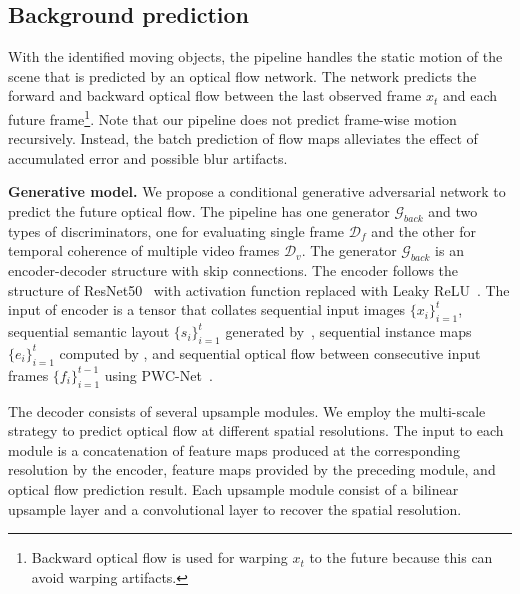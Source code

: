 \documentclass[10pt,twocolumn,letterpaper]{article}
\begin{document}
\subsection{Background prediction}
With the identified moving objects, the pipeline handles the static motion of the scene that is predicted by an optical flow network. The network predicts the forward and backward optical flow between the last observed frame $x_{t}$ and each future frame\footnote{Backward optical flow is used for warping $x_t$ to the future because this can avoid warping artifacts.}. Note that our pipeline does not predict frame-wise motion recursively. Instead, the batch prediction of flow maps alleviates the effect of accumulated error and possible blur artifacts.

\vspace{2mm}
\noindent\textbf{Generative model.}
We propose a conditional generative adversarial network to predict the future optical flow. The pipeline has one generator $\mathcal{G}_{back}$ and two types of discriminators, one for evaluating single frame $\mathcal{D}_f$ and the other for temporal coherence of multiple video frames $\mathcal{D}_v$. 
The generator $\mathcal{G}_{back}$ is an encoder-decoder structure with skip connections. The encoder follows the structure of ResNet50~\cite{resnet} with activation function replaced with Leaky ReLU~\cite{maas2013rectifier}. 
The input of encoder is a tensor that collates sequential input images $\{x_i\}_{i=1}^{t}$, sequential semantic layout $\{s_i\}_{i=1}^{t}$ generated by~\cite{semantic_cvpr19}, sequential instance maps $\{e_i\}_{i=1}^{t}$ computed by \cite{xiong19upsnet}, and sequential optical flow between consecutive input frames $\{f_i\}_{i=1}^{t-1}$ using PWC-Net~\cite{Sun2018PWC-Net}. 

The decoder consists of several upsample modules. We employ the multi-scale strategy to predict optical flow at different spatial resolutions. The input to each module is a concatenation of feature maps produced at the corresponding resolution by the encoder, feature maps provided by the preceding module, and optical flow prediction result. Each upsample module consist of a bilinear upsample layer and a convolutional layer to recover the spatial resolution.
\end{document}
